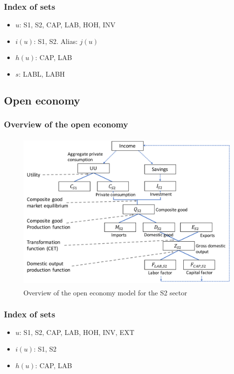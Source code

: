 \subsubsection{Index of sets}
\begin{itemize}
	\item $u$: S1, S2, CAP, LAB, HOH, INV
	\item $i(u)$: S1, S2. Alias: $j(u)$
	\item $h(u)$: CAP, LAB
	\item $s$: LABL, LABH 
\end{itemize}





\clearpage

\subsection{Open economy}
\label{app:open_economy_model}

\subsubsection{Overview of the open economy}
\begin{figure}[!ht]
	\centering
	\includegraphics[height=8cm]{figures/overview_open.pdf}
	\caption{Overview of the open economy model for the S2 sector}
	\label{fig:overview_open}
\end{figure}

\subsubsection{Index of sets}
\begin{itemize}
	\item $u$: S1, S2, CAP, LAB, HOH, INV, EXT
	\item $i(u)$: S1, S2
	\item $h(u)$: CAP, LAB
\end{itemize}


